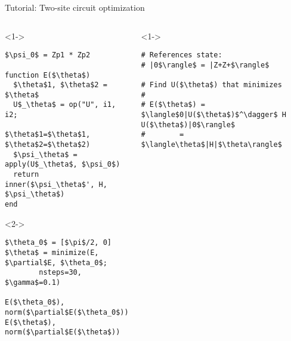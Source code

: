 \begin{frame}[fragile]{Tutorial: Two-site circuit optimization}


\begin{columns}

\begin{column}{5cm}

\begin{onlyenv}<1->

\begin{lstlisting}[language=JuliaLocal, style=julia, mathescape, basicstyle=\small]
$\psi_0$ = Zp1 * Zp2

function E($\theta$)
  $\theta$1, $\theta$2 = $\theta$
  U$_\theta$ = op("U", i1, i2;
              $\theta$1=$\theta$1, $\theta$2=$\theta$2)
  $\psi_\theta$ = apply(U$_\theta$, $\psi_0$)
  return inner($\psi_\theta$', H, $\psi_\theta$)
end
\end{lstlisting}

\end{onlyenv}

\begin{onlyenv}<2->

\begin{lstlisting}[language=JuliaLocal, style=julia, mathescape, basicstyle=\small]
$\theta_0$ = [$\pi$/2, 0]
$\theta$ = minimize(E, $\partial$E, $\theta_0$;
        nsteps=30, $\gamma$=0.1)

E($\theta_0$), norm($\partial$E($\theta_0$))
E($\theta$), norm($\partial$E($\theta$))
\end{lstlisting}

\end{onlyenv}

\end{column}

\begin{column}{5cm}

\begin{onlyenv}<1->

\begin{lstlisting}[style=julia, numbers=none, mathescape, basicstyle=\small]
# References state:
# |0$\rangle$ = |Z+Z+$\rangle$

# Find U($\theta$) that minimizes
#
# E($\theta$) = $\langle$0|U($\theta$)$^\dagger$ H U($\theta$)|0$\rangle$
#        = $\langle\theta$|H|$\theta\rangle$

 \end{lstlisting}


\end{onlyenv}
\end{column}
\end{columns}
\end{frame}
